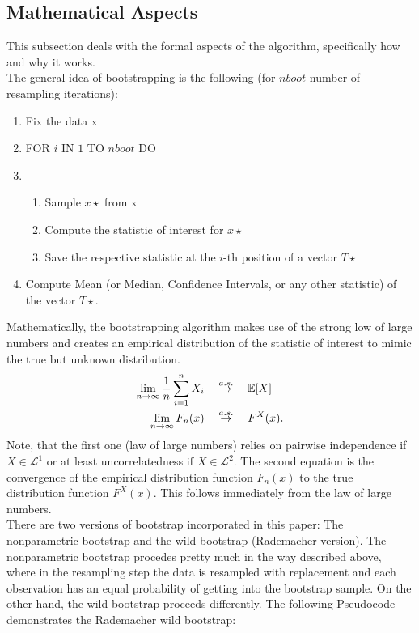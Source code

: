 \subsection{Mathematical Aspects}
This subsection deals with the formal aspects of the algorithm, specifically how and why it works.\\
The general idea of bootstrapping is the following (for $nboot$ number of resampling iterations):
\begin{enumerate}
	\item Fix the data x
	\item FOR $i$ IN $1$ TO $nboot$ DO
	\item \begin{enumerate}
		\item Sample $x\star$ from x
		\item Compute the statistic of interest for $x\star$
		\item Save the respective statistic at the $i$-th position of a vector $T\star$
	\end{enumerate}
	\item Compute Mean (or Median, Confidence Intervals, or any other statistic) of the vector $T\star$.
\end{enumerate}
Mathematically, the bootstrapping algorithm makes use of the strong low of large numbers and creates an empirical distribution of the statistic of interest to mimic the true but unknown distribution.
\begin{align*}
	\lim_{n \to \infty} \frac{1}{n}\sum_{i=1}^n X_i \quad &\stackrel{a.s.}{\to} \quad \mathbb{E}[X] \\
	\lim_{n \to \infty} F_n(x) \quad &\stackrel{a.s.}{\to} \quad F^X(x).
\end{align*}
Note, that the first one (law of large numbers) relies on pairwise independence if $X \in \mathcal{L}^1$ or at least uncorrelatedness if $X \in \mathcal{L}^2$. The second equation is the convergence of the empirical distribution function $F_n(x)$ to the true distribution function $F^X(x)$. This follows immediately from the law of large numbers.\\
There are two versions of bootstrap incorporated in this paper: The nonparametric bootstrap and the wild bootstrap (Rademacher-version). The nonparametric bootstrap procedes pretty much in the way described above, where in the resampling step the data is resampled with replacement and each observation has an equal probability of getting into the bootstrap sample. On the other hand, the wild bootstrap proceeds differently. The following Pseudocode demonstrates the Rademacher wild bootstrap:
